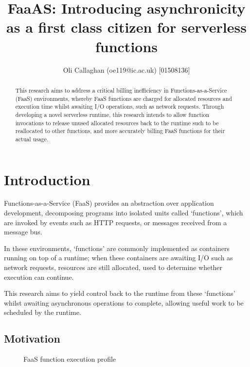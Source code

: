 \documentclass[a4paper,twocolumn]{article}
\title{\textbf{FaaAS: Introducing asynchronicity as a first class citizen for serverless functions}}
\author{Oli Callaghan (oe119@ic.ac.uk) [01508136]}
\begin{document}
\newcommand{\faas}{FaaS}
\newcommand{\faaslong}{Functions-as-a-Service}
\newcommand{\faasxlong}{\faaslong{} (\faas{})}

\maketitle

\begin{abstract}
    This research aims to address a critical billing inefficiency in \faasxlong{} environments, whereby \faas{} functions are charged for allocated resources and execution time whilst awaiting I/O operations, such as network requests. Through developing a novel serverless runtime, this research intends to allow function invocations to release unused allocated resources back to the runtime such to be reallocated to other functions, and more accurately billing \faas{} functions for their actual usage.
\end{abstract}

\tableofcontents

\section{Introduction}

\faasxlong{} provides an abstraction over application development, decomposing programs into isolated units called `functions', which are invoked by events such as HTTP requests, or messages received from a message bus.

In these environments, `functions' are commonly implemented as containers running on top of a runtime; when these containers are awaiting I/O such as network requests, resources are still allocated, used to determine whether execution can continue.

This research aims to yield control back to the runtime from these `functions' whilst awaiting asynchronous operations to complete, allowing useful work to be scheduled by the runtime.

\subsection{Motivation}
\begin{figure}
    \begin{center}
        
    \end{center}
    \caption{\faas{} function execution profile}
\end{figure}
\end{document}
